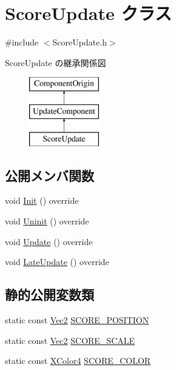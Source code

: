 \hypertarget{class_score_update}{}\section{Score\+Update クラス}
\label{class_score_update}


{\ttfamily \#include $<$Score\+Update.\+h$>$}

Score\+Update の継承関係図\begin{figure}[H]
\begin{center}
\leavevmode
\includegraphics[height=3.000000cm]{class_score_update}
\end{center}
\end{figure}
\subsection*{公開メンバ関数}
\begin{DoxyCompactItemize}
\item 
void \mbox{\hyperlink{class_score_update_afd51e11ad00ebc15d9b3139398437afc}{Init}} () override
\item 
void \mbox{\hyperlink{class_score_update_a701d9c84c3ef92b1c54f33b37e23605f}{Uninit}} () override
\item 
void \mbox{\hyperlink{class_score_update_aae2b398784079a651ed92eb4c634b1c9}{Update}} () override
\item 
void \mbox{\hyperlink{class_score_update_adc9a48f54828e49c072c298777935893}{Late\+Update}} () override
\end{DoxyCompactItemize}
\subsection*{静的公開変数類}
\begin{DoxyCompactItemize}
\item 
static const \mbox{\hyperlink{_vector3_d_8h_a5ef6e95dfc5f9d3820b71772d99bbc25}{Vec2}} \mbox{\hyperlink{class_score_update_a88bd91fc66dd629a849ab9f0a178150c}{S\+C\+O\+R\+E\+\_\+\+P\+O\+S\+I\+T\+I\+ON}}
\item 
static const \mbox{\hyperlink{_vector3_d_8h_a5ef6e95dfc5f9d3820b71772d99bbc25}{Vec2}} \mbox{\hyperlink{class_score_update_a23e9b8c4c6624cf5f3b66258771b3243}{S\+C\+O\+R\+E\+\_\+\+S\+C\+A\+LE}}
\item 
static const \mbox{\hyperlink{_vector3_d_8h_a680c30c4a07d86fe763c7e01169cd6cc}{X\+Color4}} \mbox{\hyperlink{class_score_update_ab78fc9ad68faf9f5be01096b5d60959e}{S\+C\+O\+R\+E\+\_\+\+C\+O\+L\+OR}}
\end{DoxyCompactItemize}


